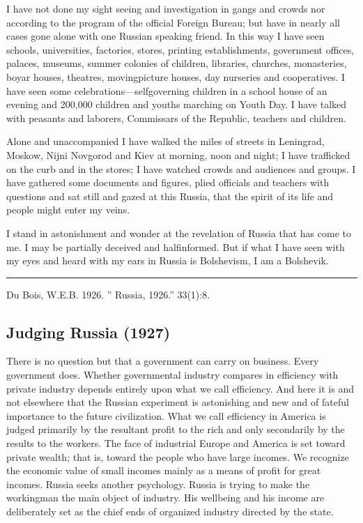 \documentclass[letterpaper,10pt,english]{jupyterBook}
\begin{document}
\sphinxAtStartPar
I have not done my sight seeing and investigation in gangs and crowds nor according to the program of the official Foreign Bureau; but have in nearly all cases gone alone with one Russian speaking friend. In this way I have seen schools, universities, factories, stores, printing establishments, government offices, palaces, museums, summer colonies of children, libraries, churches, monasteries, boyar houses, theatres, moving\sphinxhyphen{}picture houses, day nurseries and co\sphinxhyphen{}operatives. I have seen some celebrations—self\sphinxhyphen{}governing children in a school house of an evening and 200,000 children and youths marching on Youth Day. I have talked with peasants and laborers, Commissars of the Republic, teachers and children.

\sphinxAtStartPar
Alone and unaccompanied I have walked the miles of streets in Leningrad, Moskow, Nijni Novgorod and Kiev at morning, noon and night; I have trafficked on the curb and in the stores; I have watched crowds and audiences and groups. I have gathered some documents and figures, plied officials and teachers with questions and sat still and gazed at this Russia, that the spirit of its life and people might enter my veins.

\sphinxAtStartPar
I stand in astonishment and wonder at the revelation of Russia that has come to me. I may be partially deceived and half\sphinxhyphen{}informed. But if what I have seen with my eyes and heard with my ears in Russia is Bolshevism, I am a Bolshevik.


\bigskip\hrule\bigskip


\sphinxAtStartPar
{} Du Bois, W.E.B. 1926. ” Russia, 1926.”  33(1):8.


\subsection{Judging Russia (1927)}
\label{\detokenize{Volumes/33/04/judging_russia:judging-russia-1927}}\label{\detokenize{Volumes/33/04/judging_russia::doc}}
\sphinxAtStartPar
There is no question but that a government can carry on business. Every government does. Whether governmental industry compares in efficiency with private industry depends entirely upon what we call efficiency. And here it is and not elsewhere that the Russian experiment is astonishing and new and of fateful importance to the future civilization. What we call efficiency in America is judged primarily by the resultant profit to the rich and only secondarily by the results to the workers. The face of industrial Europe and America is set toward private wealth; that is, toward the people who have large incomes. We recognize the economic value of small incomes mainly as a means of profit for great incomes. Russia seeks another psychology. Russia is trying to make the workingman the main object of industry. His well\sphinxhyphen{}being and his income are deliberately set as the chief ends of organized industry directed by the state.
\end{document}
